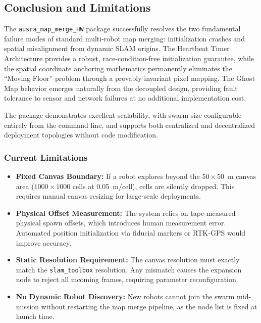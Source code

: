 \documentclass{article}
\begin{document}
\subsection{Conclusion and Limitations}
\label{subsec:map_merge_conclusion}

The \texttt{ausra\_map\_merge\_HW} package successfully resolves the two fundamental failure modes of standard multi-robot map merging: initialization crashes and spatial misalignment from dynamic SLAM origins. The Heartbeat Timer Architecture provides a robust, race-condition-free initialization guarantee, while the spatial coordinate anchoring mathematics permanently eliminates the ``Moving Floor'' problem through a provably invariant pixel mapping. The Ghost Map behavior emerges naturally from the decoupled design, providing fault tolerance to sensor and network failures at no additional implementation cost.

The package demonstrates excellent scalability, with swarm size configurable entirely from the command line, and supports both centralized and decentralized deployment topologies without code modification.

\subsubsection{Current Limitations}

\begin{itemize}
    \item \textbf{Fixed Canvas Boundary:} If a robot explores beyond the $50 \times 50$~m canvas area ($1000 \times 1000$ cells at 0.05~m/cell), cells are silently dropped. This requires manual canvas resizing for large-scale deployments.

    \item \textbf{Physical Offset Measurement:} The system relies on tape-measured physical spawn offsets, which introduces human measurement error. Automated position initialization via fiducial markers or RTK-GPS would improve accuracy.

    \item \textbf{Static Resolution Requirement:} The canvas resolution must exactly match the \texttt{slam\_toolbox} resolution. Any mismatch causes the expansion node to reject all incoming frames, requiring parameter reconfiguration.

    \item \textbf{No Dynamic Robot Discovery:} New robots cannot join the swarm mid-mission without restarting the map merge pipeline, as the node list is fixed at launch time.
\end{itemize}
\end{document}
